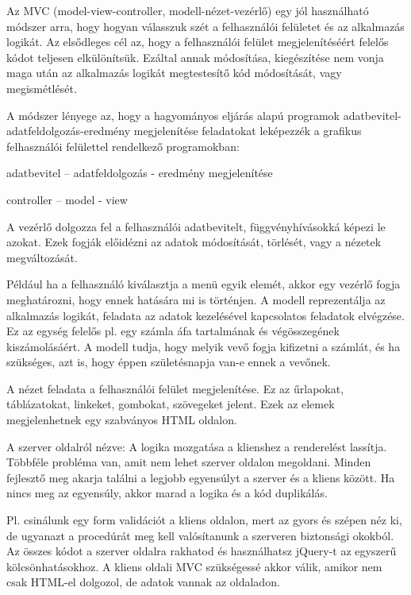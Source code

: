 

Az MVC (model-view-controller, modell-nézet-vezérlő) egy jól használható módszer arra, hogy hogyan válasszuk szét a felhasználói felületet és az alkalmazás logikát. Az elsődleges cél az, hogy a felhasználói felület megjelenítéséért felelős kódot teljesen elkülönítsük. Ezáltal annak módosítása, kiegészítése nem vonja maga után az alkalmazás logikát megtestesítő kód módosítását, vagy megismétlését.

A módszer lényege az, hogy a hagyományos eljárás alapú programok adatbevitel-adatfeldolgozás-eredmény megjelenítése feladatokat leképezzék a grafikus felhasználói felülettel rendelkező programokban:

adatbevitel – adatfeldolgozás - eredmény megjelenítése

controller – model - view

A vezérlő dolgozza fel a felhasználói adatbevitelt, függvényhívásokká képezi le azokat. Ezek fogják előidézni az adatok módosítását, törlését, vagy a nézetek megváltozását. 

Például ha a felhasználó kiválasztja a menü egyik elemét, akkor egy vezérlő fogja meghatározni, hogy ennek hatására mi is történjen.
A modell reprezentálja az alkalmazás logikát, feladata az adatok kezelésével kapcsolatos feladatok elvégzése. Ez az egység felelős pl. egy számla áfa tartalmának és végösszegének kiszámolásáért. A modell tudja, hogy melyik vevő fogja kifizetni a számlát, és ha szükséges, azt is, hogy éppen születésnapja van-e ennek a vevőnek.

A nézet feladata a felhasználói felület megjelenítése. Ez az űrlapokat, táblázatokat, linkeket, gombokat, szövegeket jelent. Ezek az elemek megjelenhetnek egy szabványos HTML oldalon.


A szerver oldalról nézve: A logika mozgatása a klienshez a renderelést lassítja. Többféle probléma van, amit nem lehet szerver oldalon megoldani. Minden fejlesztő meg akarja találni a legjobb egyensúlyt a szerver és a kliens között. Ha nincs meg az egyensúly, akkor marad a logika és a kód duplikálás.

Pl. csinálunk egy form validációt a kliens oldalon, mert az gyors és szépen néz ki, de ugyanazt a procedúrát meg kell valósítanunk a szerveren biztonsági okokból. Az összes kódot a szerver oldalra rakhatod és használhatsz jQuery-t az egyszerű kölcsönhatásokhoz. A kliens oldali MVC szükségessé akkor válik, amikor nem csak HTML-el dolgozol, de adatok vannak az oldaladon.

